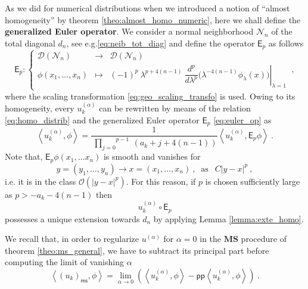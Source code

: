 \documentclass[11pt]{book}
\newcommand{\pp}{\mathsf{pp}}
\newcommand{\ms}{\mathsf{ms}}
\newcommand{\MS}{\textbf{MS}}
\newcommand{\sm}[1]{\left\langle#1\right\rangle}
\newcommand{\Dcal}{\mathcal{D}}
\newcommand{\Ncal}{\mathcal{N}}
\newcommand{\Ocal}{\mathcal{O}}
\newcommand{\Esf}{\mathsf{E}}
\theoremstyle{break}
\begin{document}
\bigskip


As we did for numerical distributions when we introduced a notion of ``almost homogeneity'' by theorem \ref{theo:almost_homo_numeric}, here we shall define the \textbf{generalized Euler operator}. We consider a normal neighborhood $\Ncal_n$ of the total diagonal $d_n$, see e.g.\eqref{eq:neib_tot_diag} and define the operator $\Esf_p$ as follows
%
\begin{equation}
\Esf_p : \left\{
\begin{array}{lcl}
\Dcal(\Ncal_n) & \to & \Dcal(\Ncal_n) \\
\phi(x_1,\dots, x_n) & \mapsto & \left. (-1)^p \ \lambda^{p+4(n-1)} \ \dfrac{d^p}{d\lambda^p} \bigg( \lambda^{-4(n-1)}  \phi_\lambda(x) \bigg) \right|_{\lambda = 1}
\end{array}
\right. \ ,
\label{eq:euler_op}
%
\end{equation}
%
where the scaling transformation \eqref{eq:geo_scaling_transfo} is used. Owing to its homogeneity, every $u^{(\alpha)}_k$ can be rewritten by means of the relation \eqref{eq:homo_distrib} and the generalized Euler operator $\Esf_p$ \eqref{eq:euler_op} as
%
\begin{equation}
\sm{ u^{(\alpha)}_k, \phi } = \frac{1}{\overset{p-1}{\ \underset{j=0}{\prod}} \ (a_k+j+4(n-1))}   \sm{ u^{(\alpha)}_k, \Esf_p \phi } \ .
\label{eq:expose_poles}
\end{equation}
%
Note that, $\Esf_p \phi(x_1, \dots x_n)$ is smooth and vanishes for
%
\begin{equation*}
y = (y_1 , \dots , y_n) \to x = (x_1, \dots , x_n) \ , \ \mbox{ as } \ \ C|y-x|^p \ , 
\end{equation*}
%
i.e. it is in the class $\Ocal(|y-x|^{p})$. For this reason, if  $p$ is chosen sufficiently large as $p > -a_k-4(n-1)$ then 
\begin{equation*}
u^{(\alpha)}_k \circ \Esf_p 
\end{equation*}
%
possesses a unique extension towards $d_n$ by applying Lemma \ref{lemma:exte_homo}. 


\bigskip


We recall that, in order to regularize $u^{(\alpha)}$ for $\alpha=0$ in the $\MS$ procedure of theorem \ref{theo:ms_general}, we have to subtract its principal part before computing the limit of vanishing $\alpha$
%
\begin{equation*}
\sm{ (u_k)_\ms, \phi } = \lim_{\alpha \to 0} \left( \sm{ u^{(\alpha)}_k, \phi } - \pp\sm{ u^{(\alpha)}_k , \phi } \right) \ .
\end{equation*}
\end{document}
